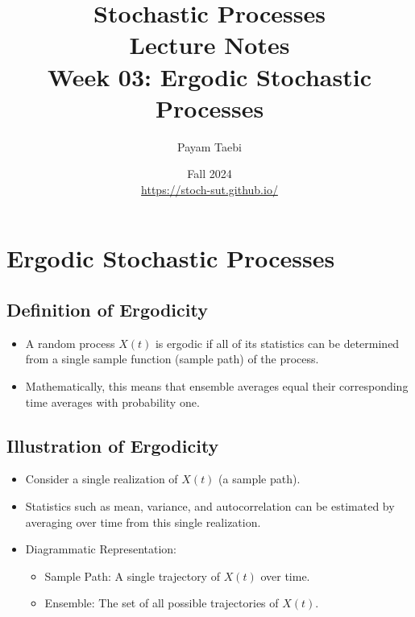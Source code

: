 \documentclass[12pt]{article}
\title{
    \vspace{-2cm}
    \LARGE{Stochastic Processes} \\
    \vspace{0.5cm}
    \Large{Lecture Notes} \\
    \vspace{0.5cm}
    \normalsize{Week 03: Ergodic Stochastic Processes}
}
\author{
    Payam Taebi \\
    \vspace{0.2cm}
    \normalsize{}
}
\date{
    Fall 2024 \\
    \vspace{0.2cm}
    \href{https://stoch-sut.github.io/}{https://stoch-sut.github.io/}
}
\begin{document}
\maketitle
\tableofcontents
\newpage

\section{Ergodic Stochastic Processes}

\subsection{Definition of Ergodicity}
\begin{itemize}
    \item A random process \( X(t) \) is ergodic if all of its statistics can be determined from a single sample function (sample path) of the process.
    \item Mathematically, this means that ensemble averages equal their corresponding time averages with probability one.
\end{itemize}

\subsection{Illustration of Ergodicity}
\begin{itemize}
    \item Consider a single realization of \( X(t) \) (a sample path).
    \item Statistics such as mean, variance, and autocorrelation can be estimated by averaging over time from this single realization.
    \item Diagrammatic Representation:
    \begin{itemize}
        \item Sample Path: A single trajectory of \( X(t) \) over time.
        \item Ensemble: The set of all possible trajectories of \( X(t) \).
    \end{itemize}
\end{itemize}
\end{document}
